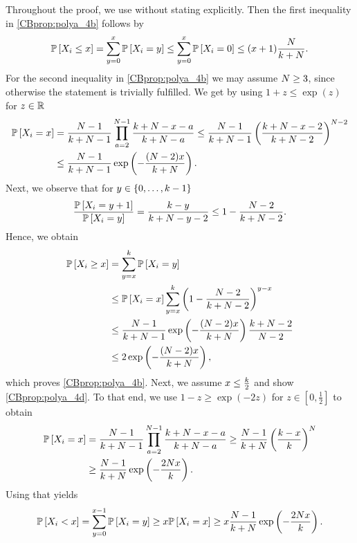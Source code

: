 Throughout the proof, we use  without stating explicitly. Then the first inequality in \ref{CBprop:polya_4b} follows by 
\begin{align*}
\mathbb{P}\left[X_i\leq x\right]=\sum_{y=0}^{x}\mathbb{P}\left[X_i=y\right]\leq\sum_{y=0}^{x}\mathbb{P}\left[X_i=0\right]\leq (x+1)\frac{N}{k+N}.
\end{align*}
For the second inequality in \ref{CBprop:polya_4b} we may assume $N\geq 3$, since otherwise the statement is trivially fulfilled. We get by using $1+z\leq \exp(z)$ for $z\in \mathbb{R}$
\begin{align*}
\mathbb{P}\left[X_i=x\right]&=\frac{N-1}{k+N-1}\prod_{a=2}^{N-1}\frac{k+N-x-a}{k+N-a}
\leq\frac{N-1}{k+N-1}\left(\frac{k+N-x-2}{k+N-2}\right)^{N-2}
\\
&\leq
\frac{N-1}{k+N-1}\exp\left(-\frac{(N-2)x}{k+N}\right).
\end{align*}
Next, we observe that for $y\in \{0, \ldots ,k-1\}$
\[\frac{\mathbb{P}\left[X_i=y+1\right]}{\mathbb{P}\left[X_i=y\right]}=\frac{k-y}{k+N-y-2}\leq 1-\frac{N-2}{k+N-2}.\]
Hence, we obtain
\begin{align*}
\mathbb{P}\left[X_i\geq x\right]&=\sum_{y=x}^{k}\mathbb{P}\left[X_i=y\right]
\\
&\leq \mathbb{P}\left[X_i=x\right]\sum_{y=x}^{k}\left(1-\frac{N-2}{k+N-2}\right)^{y-x}
\\
&\leq \frac{N-1}{k+N-1}\exp\left(-\frac{(N-2)x}{k+N}\right) \frac{k+N-2}{N-2}
\\
&\leq 2\exp\left(-\frac{(N-2)x}{k+N}\right),
\end{align*}
which proves \ref{CBprop:polya_4b}. Next, we assume $x \leq \frac{k}{2}$ and show \ref{CBprop:polya_4d}. To that end, we use $1-z\geq \exp(-2z)$ for $z\in \left[0,\frac{1}{2}\right]$ to obtain
\begin{align}\label{CBproof:prop_polya_4d}
\mathbb{P}\left[X_i=x\right]&=\frac{N-1}{k+N-1}\prod_{a=2}^{N-1}\frac{k+N-x-a}{k+N-a}
\geq\frac{N-1}{k+N}\left(\frac{k-x}{k}\right)^{N}\nonumber
\\
&\geq \frac{N-1}{k+N}\exp\left(-\frac{2N x}{k}\right).
\end{align}
Using that yields
\begin{align*}
\mathbb{P}\left[X_i< x\right]=\sum_{y=0}^{x-1} \mathbb{P}\left[X_i=y \right]\geq x \mathbb{P}\left[X_i=x\right]
\geq x\frac{N-1}{k+N}\exp\left(-\frac{2N x}{k}\right).
\end{align*}
